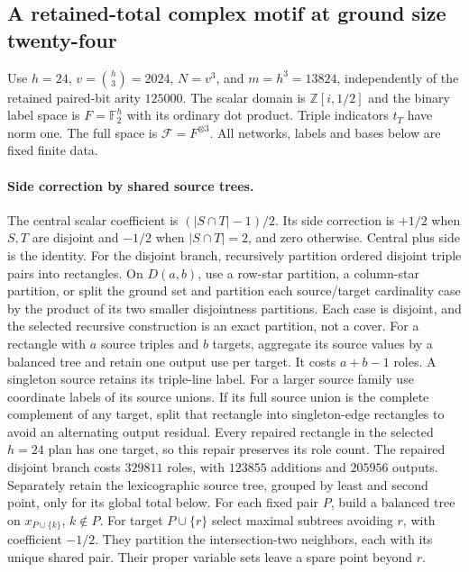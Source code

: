 \subsection{A retained-total complex motif at ground size twenty-four}
\label{sec:retained-complex-construction}
Use $h=24$, $v=\binom h3=2024$, $N=v^3$, and $m=h^3=13824$,
independently of the retained paired-bit arity $125000$.
The scalar domain is $\mathbb Z[i,1/2]$ and the binary label space is
$F=\mathbb F_2^h$ with its ordinary dot product. Triple indicators $t_T$
have norm one. The full space is $\mathcal F=F^{\otimes3}$.
All networks, labels and bases below are fixed finite data.

\paragraph{Side correction by shared source trees.}
The central scalar coefficient is $(|S\cap T|-1)/2$.
Its side correction is $+1/2$ when $S,T$ are disjoint and $-1/2$ when
$|S\cap T|=2$, and zero otherwise. Central plus side is the identity.
For the disjoint branch, recursively partition ordered disjoint triple pairs
into rectangles. On $D(a,b)$, use a row-star partition, a column-star partition,
or split the ground set and partition each source/target cardinality case by
the product of its two smaller disjointness partitions. Each case is disjoint,
and the selected recursive construction is an exact partition, not a cover.
For a rectangle with $a$ source triples and $b$ targets, aggregate its source
values by a balanced tree and retain one output use per target. It costs
$a+b-1$ roles. A singleton source retains its triple-line label.
For a larger source family use coordinate labels of its source unions.
If its full source union is the complete complement of any target, split that
rectangle into singleton-edge rectangles to avoid an alternating output
residual. Every repaired rectangle in the selected $h=24$ plan has one target,
so this repair preserves its role count. The repaired disjoint branch costs
$329811$ roles, with $123855$ additions and $205956$ outputs.
Separately retain the lexicographic source tree, grouped by least and second
point, only for its global total below.
For each fixed pair $P$, build a balanced tree on $x_{P\cup\{k\}}$, $k\notin P$.
For target $P\cup\{r\}$ select maximal subtrees avoiding $r$, with coefficient
$-1/2$. They partition the intersection-two neighbors, each with its unique
shared pair. Their proper variable sets leave a spare point beyond $r$.


